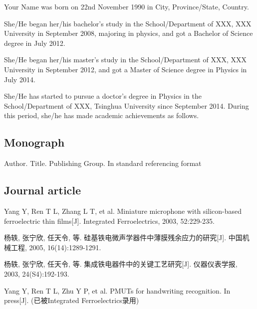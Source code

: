 
\begin{resume}

    Your Name was born on 22nd November 1990 in City, Province/State, Country. 
    
    She/He began her/his bachelor’s study in the School/Department of XXX, XXX University in September 2008, majoring in physics, and got a Bachelor of Science degree in July 2012.
    
    She/He began her/his master’s study in the School/Department of XXX, XXX University in September 2012, and got a Master of Science degree in Physics in July 2014.
    
    She/He has started to pursue a doctor’s degree in Physics in the School/Department of XXX, Tsinghua University since September 2014. During this period, she/he has made academic achievements as follows.
    



  
  \subsection*{\textbf{Monograph}}
  \begin{achievements}
    \item Author. Title. Publishing Group. In standard referencing format
  \end{achievements}
  \subsection*{\textbf{Journal article}}
  \begin{achievements}
    \item Yang Y, Ren T L, Zhang L T, et al. Miniature microphone with silicon-based ferroelectric thin films[J]. Integrated Ferroelectrics, 2003, 52:229-235.
    \item 杨轶, 张宁欣, 任天令, 等. 硅基铁电微声学器件中薄膜残余应力的研究[J]. 中国机械工程, 2005, 16(14):1289-1291.
    \item 杨轶, 张宁欣, 任天令, 等. 集成铁电器件中的关键工艺研究[J]. 仪器仪表学报, 2003, 24(S4):192-193.
    \item Yang Y, Ren T L, Zhu Y P, et al. PMUTs for handwriting recognition. In press[J]. (已被Integrated Ferroelectrics录用)
  \end{achievements}



\end{resume}
